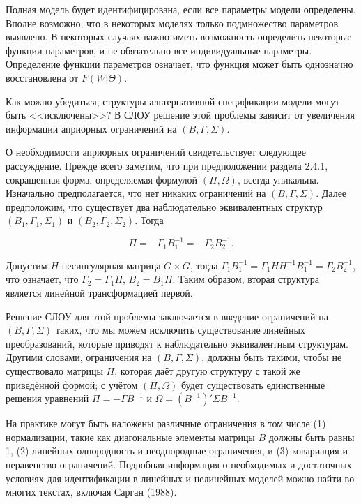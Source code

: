 	Полная модель будет идентифицирована, если все параметры модели определены. Вполне возможно, что в некоторых моделях только подмножество параметров выявлено. В некоторых случаях важно иметь возможность определить некоторые функции параметров, и не обязательно все индивидуальные параметры. Определение функции параметров означает, что функция может быть однозначно восстановлена от $F(W|\Theta)$.


	Как можно убедиться, структуры альтернативной спецификации модели могут быть <<исключены>>? В СЛОУ решение этой проблемы зависит от увеличения информации априорных ограничений на $(B,\Gamma,\Sigma)$. 
	
	
	О необходимости априорных ограничений свидетельствует следующее рассуждение. Прежде всего заметим, что при предположении раздела 2.4.1, сокращенная форма, определяемая формулой $(\Pi,\Omega)$, всегда уникальна. Изначально предполагается, что нет никаких ограничений на $(B,\Gamma,\Sigma)$. Далее предположим, что существует два наблюдательно эквивалентных структур $(B_{1},\Gamma_{1},\Sigma_{1})$ и $(B_{2},\Gamma_{2},\Sigma_{2})$. Тогда
	
\begin{equation}
\Pi=-\Gamma_{1} B^{-1}_{1}=-\Gamma_{2} B^{-1}_{2}.
\end{equation}


Допустим $H$ несингулярная матрица $G \times G$, тогда
$\Gamma_{1} B^{-1}_{1}=\Gamma_{1} H H^{-1} B^{-1}_{1}=\Gamma_{2} B^{-1}_{2}$, что означает, что $\Gamma_{2}=\Gamma_{1}H$, $B_{2}=B_{1}H$. Таким образом, вторая структура является линейной трансформацией первой.


	Решение СЛОУ для этой проблемы заключается в введение ограничений на $(B,\Gamma,\Sigma)$ таких, что мы можем исключить существование линейных преобразований, которые приводят к наблюдательно эквивалентным структурам. Другими словами, ограничения на $(B,\Gamma,\Sigma)$, должны быть такими, чтобы не существовало матрицы $H$, которая даёт другую структуру с такой же приведённой формой; с учётом $(\Pi,\Omega)$ будет существовать единственные решения уравнений $\Pi=-\Gamma B^{-1}$ и $\Omega=(B^{-1})'\Sigma B^{-1}$.
	
	
	На практике могут быть наложены различные ограничения в том числе (1) нормализации, такие как диагональные элементы матрицы $B$ должны быть равны 1, (2) линейных однородность и неоднородные ограничения, и (3) ковариация и неравенство ограничений. Подробная информация о необходимых и достаточных условиях для идентификации в линейных и нелинейных моделей можно найти во многих текстах, включая Сарган (1988).
	
